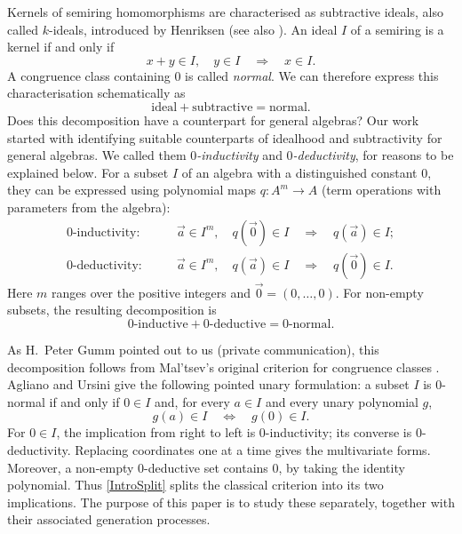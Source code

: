 \documentclass[12pt,english]{amsart}
\theoremstyle{definition}
\numberwithin{equation}{section}
\theoremstyle{remark}
\begin{document}
Kernels of semiring homomorphisms are characterised as subtractive ideals, also called $k$-ideals,  introduced by Henriksen \cite{Hen58} (see also \cite{AA08, Gol99, Han15, JRT22, LaG95, LaT65, Les15, SA92, SA93, WSA96, DG24}).  An ideal $I$ of a semiring is a kernel if and only if
\[
x+y\in I,\quad y\in I\quad\Longrightarrow\quad x\in I.
\]
A congruence class containing $0$ is called \emph{normal}. We can therefore express this characterisation schematically as
\begin{equation}\label{EquG}
\text{ideal}+\text{subtractive}=\text{normal}.
\end{equation}
Does this decomposition have a counterpart for general algebras? Our work started with identifying suitable counterparts of idealhood and subtractivity for general algebras. We called them \emph{$0$-inductivity} and \emph{$0$-deductivity}, for reasons to be explained below. For a subset $I$ of an algebra with a distinguished constant $0$, they can be expressed using polynomial maps $q\colon A^m\to A$ (term operations with parameters from the algebra):
\begin{align*}
\text{$0$-inductivity:}\qquad
&\vec a\in I^m,\quad q(\vec0)\in I\quad\Longrightarrow\quad q(\vec a)\in I;\\
\text{$0$-deductivity:}\qquad
&\vec a\in I^m,\quad q(\vec a)\in I\quad\Longrightarrow\quad q(\vec0)\in I.
\end{align*}
Here $m$ ranges over the positive integers and $\vec0=(0,\ldots,0)$. For non-empty subsets, the resulting decomposition is
\begin{equation}\label{IntroSplit}
0\text{-inductive}+0\text{-deductive}=0\text{-normal}.
\end{equation}

As H.~Peter Gumm pointed out to us (private communication), this decomposition follows from Mal'tsev's original criterion for congruence classes \cite{Mal54}. Agliano and Ursini \cite[Proposition 1.4(4)]{AU92} give the following pointed unary formulation: a subset $I$ is $0$-normal if and only if $0\in I$ and, for every $a\in I$ and every unary polynomial $g$,
\[
g(a)\in I\quad\Longleftrightarrow\quad g(0)\in I.
\]
For $0\in I$, the implication from right to left is $0$-inductivity; its converse is $0$-deductivity. Replacing coordinates one at a time gives the multivariate forms. Moreover, a non-empty $0$-deductive set contains $0$, by taking the identity polynomial. Thus \eqref{IntroSplit} splits the classical criterion into its two implications. The purpose of this paper is to study these separately, together with their associated generation processes.
\end{document}
